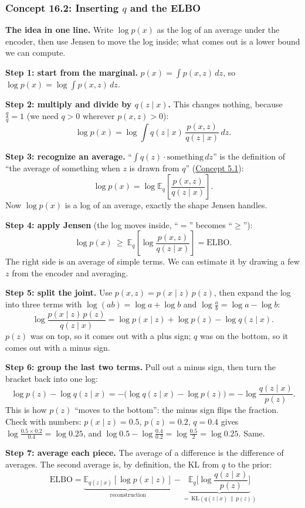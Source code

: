 \documentclass[12pt,a4paper]{article}
\begin{document}
\subsubsection{Concept 16.2: Inserting $q$ and the ELBO}\label{c16-2}

\textbf{The idea in one line.} Write $\log p(x)$ as the log of an average under the encoder, then use Jensen to move the log inside; what comes out is a lower bound we can compute.

\textbf{Step 1: start from the marginal.} $p(x)=\int p(x,z)\,dz$, so $\log p(x)=\log\int p(x,z)\,dz$.

\textbf{Step 2: multiply and divide by $q(z\mid x)$.} This changes nothing, because $\frac{q}{q}=1$ (we need $q>0$ wherever $p(x,z)>0$):
\[
\log p(x)=\log\int q(z\mid x)\,\frac{p(x,z)}{q(z\mid x)}\,dz .
\]

\textbf{Step 3: recognize an average.} ``$\int q(z)\cdot\text{something}\,dz$'' is the definition of ``the average of something when $z$ is drawn from $q$'' (\hyperref[c5-1]{Concept 5.1}):
\[
\log p(x)=\log\mathbb{E}_{q}\!\left[\frac{p(x,z)}{q(z\mid x)}\right].
\]
Now $\log p(x)$ is a log of an average, exactly the shape Jensen handles.

\textbf{Step 4: apply Jensen} (the log moves inside, ``$=$'' becomes ``$\ge$''):
\[
\log p(x)\ \ge\ \mathbb{E}_{q}\!\left[\log\frac{p(x,z)}{q(z\mid x)}\right]=\text{ELBO}.
\]
The right side is an average of simple terms. We can estimate it by drawing a few $z$ from the encoder and averaging.

\textbf{Step 5: split the joint.} Use $p(x,z)=p(x\mid z)\,p(z)$, then expand the log into three terms with $\log(ab)=\log a+\log b$ and $\log\frac ab=\log a-\log b$:
\[
\log\frac{p(x\mid z)\,p(z)}{q(z\mid x)}=\log p(x\mid z)+\log p(z)-\log q(z\mid x).
\]
$p(z)$ was on top, so it comes out with a plus sign; $q$ was on the bottom, so it comes out with a minus sign.

\textbf{Step 6: group the last two terms.} Pull out a minus sign, then turn the bracket back into one log:
\[
\log p(z)-\log q(z\mid x)=-\big(\log q(z\mid x)-\log p(z)\big)=-\log\frac{q(z\mid x)}{p(z)} .
\]
This is how $p(z)$ ``moves to the bottom'': the minus sign flips the fraction. Check with numbers: $p(x\mid z)=0.5$, $p(z)=0.2$, $q=0.4$ gives $\log\frac{0.5\times0.2}{0.4}=\log0.25$, and $\log0.5-\log\frac{0.4}{0.2}=\log\frac{0.5}{2}=\log0.25$. Same.

\textbf{Step 7: average each piece.} The average of a difference is the difference of averages. The second average is, by definition, the KL from $q$ to the prior:
\[
\text{ELBO}=\underbrace{\mathbb{E}_{q(z\mid x)}[\log p(x\mid z)]}_{\text{reconstruction}}-\underbrace{\mathbb{E}_{q}\!\Big[\log\frac{q(z\mid x)}{p(z)}\Big]}_{=\ \mathrm{KL}(q(z\mid x)\,\|\,p(z))}
\]
\end{document}
